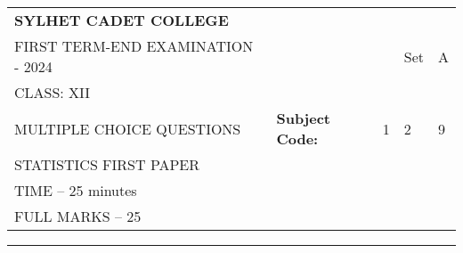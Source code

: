 \documentclass{exam}
\begin{document}
\begin{table}[h]
\centering
\begin{tabular}{lllll}
\textbf{\large SYLHET CADET COLLEGE} &  &  &  &  \\ \cline{4-5} 
FIRST TERM-END EXAMINATION - 2024 &  & \multicolumn{1}{l|}{} & \multicolumn{1}{l|}{Set} & \multicolumn{1}{l|}{A} \\ \cline{4-5} 
CLASS: XII &  &  &  &  \\ \cline{3-5} 
MULTIPLE CHOICE QUESTIONS & \multicolumn{1}{l|}{\textbf{Subject Code:}} & \multicolumn{1}{l|}{1} & \multicolumn{1}{l|}{2} & \multicolumn{1}{l|}{9} \\ \cline{3-5} 
STATISTICS FIRST PAPER &  &  &  &  \\
TIME – 25 minutes &  &  &  &  \\
FULL MARKS – 25 &  &  &  & 
\end{tabular}
\end{table}
\hrule
\end{document}
